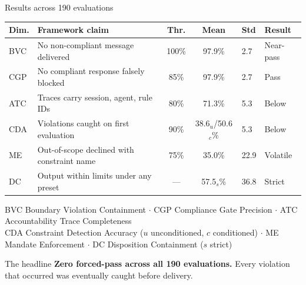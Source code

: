 \documentclass[aspectratio=169,10pt]{beamer}
\newcommand{\key}[1]{\textcolor{aiAccent}{\textbf{#1}}}
\newcommand{\ok}[1]{\textcolor{aiOK}{#1}}
\newcommand{\bad}[1]{\textcolor{aiWarn}{#1}}
\begin{document}
\begin{frame}{Results across 190 evaluations}
  \centering\small
  \begin{tabularx}{0.97\textwidth}{@{}lXccll@{}}
    \toprule
    \textbf{Dim.} & \textbf{Framework claim} & \textbf{Thr.} & \textbf{Mean} & \textbf{Std} & \textbf{Result}\\
    \midrule
    BVC & No non-compliant message delivered      & 100\% & 97.9\% & 2.7  & Near-pass \\
    CGP & No compliant response falsely blocked   & 85\%  & 97.9\% & 2.7  & \ok{Pass} \\
    ATC & Traces carry session, agent, rule IDs   & 80\%  & 71.3\% & 5.3  & \bad{Below} \\
    CDA & Violations caught on first evaluation   & 90\%  & 38.6$_u$/50.6$_c$\% & 5.3 & \bad{Below} \\
    ME  & Out-of-scope declined with constraint name & 75\% & 35.0\% & 22.9 & Volatile \\
    DC  & Output within limits under any preset   & ---   & 57.5$_s$\% & 36.8 & Strict \\
    \bottomrule
  \end{tabularx}
  \vspace{0.5em}

  {\footnotesize\color{aiGray}
   BVC Boundary Violation Containment $\cdot$ CGP Compliance Gate Precision $\cdot$
   ATC Accountability Trace Completeness\\
   CDA Constraint Detection Accuracy ($u$ unconditioned, $c$ conditioned) $\cdot$
   ME Mandate Enforcement $\cdot$ DC Disposition Containment ($s$ strict)}
  \vspace{0.9em}

  \begin{block}{The headline}
    \key{Zero forced-pass across all 190 evaluations.} Every violation that
    occurred was eventually caught before delivery.
  \end{block}
\end{frame}
\end{document}
